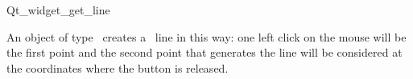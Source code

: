 
\begin{ccRefClass}{Qt_widget_get_line}

\ccDefinition
An object of type \ccRefName\ creates a \cgal\ line in this way: one 
left click on the mouse will be the first point and the second point that 
generates the line will be considered at the coordinates where the button is 
released.


\ccInheritsFrom
{}

\ccGlue

\ccCreation
{}


\end{ccRefClass}









